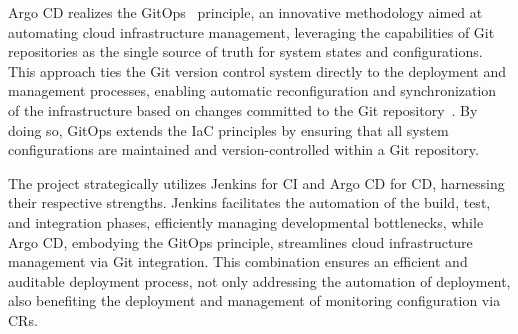 Argo CD realizes the GitOps~\parencite{WeaveworksWeavegitopsWeave} principle, an innovative methodology aimed at automating cloud infrastructure management, leveraging the capabilities of Git repositories as the single source of truth for system states and configurations. This approach ties the Git version control system directly to the deployment and management processes, enabling automatic reconfiguration and synchronization of the infrastructure based on changes committed to the Git repository~\parencite{beetzGitOpsEvolutionDevOps2022}. By doing so, GitOps extends the \ac{IaC} principles by ensuring that all system configurations are maintained and version-controlled within a Git repository. 

The project strategically utilizes Jenkins for \ac{CI} and Argo CD for \ac{CD}, harnessing their respective strengths. Jenkins facilitates the automation of the build, test, and integration phases, efficiently managing developmental bottlenecks, while Argo CD, embodying the GitOps principle, streamlines cloud infrastructure management via Git integration. This combination ensures an efficient and auditable deployment process, not only addressing the automation of deployment, also benefiting the deployment and management of monitoring configuration via \ac{CR}s.




